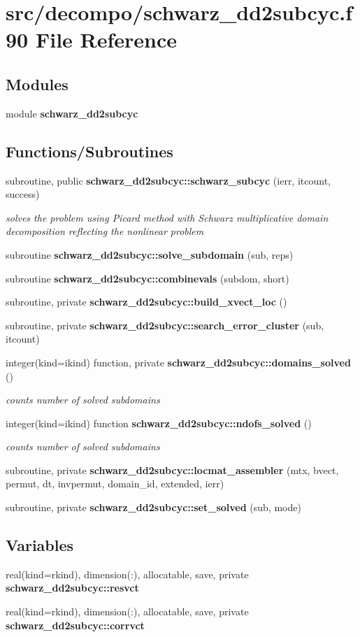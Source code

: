 \section{src/decompo/schwarz\+\_\+dd2subcyc.f90 File Reference}
\label{schwarz__dd2subcyc_8f90}
\subsection*{Modules}
\begin{DoxyCompactItemize}
\item 
module {\bf schwarz\+\_\+dd2subcyc}
\end{DoxyCompactItemize}
\subsection*{Functions/\+Subroutines}
\begin{DoxyCompactItemize}
\item 
subroutine, public {\bf schwarz\+\_\+dd2subcyc\+::schwarz\+\_\+subcyc} (ierr, itcount, success)
\begin{DoxyCompactList}\small\item\em solves the problem using Picard method with Schwarz multiplicative domain decomposition reflecting the nonlinear problem \end{DoxyCompactList}\item 
subroutine {\bf schwarz\+\_\+dd2subcyc\+::solve\+\_\+subdomain} (sub, reps)
\item 
subroutine {\bf schwarz\+\_\+dd2subcyc\+::combinevals} (subdom, short)
\item 
subroutine, private {\bf schwarz\+\_\+dd2subcyc\+::build\+\_\+xvect\+\_\+loc} ()
\item 
subroutine, private {\bf schwarz\+\_\+dd2subcyc\+::search\+\_\+error\+\_\+cluster} (sub, itcount)
\item 
integer(kind=ikind) function, private {\bf schwarz\+\_\+dd2subcyc\+::domains\+\_\+solved} ()
\begin{DoxyCompactList}\small\item\em counts number of solved subdomains \end{DoxyCompactList}\item 
integer(kind=ikind) function {\bf schwarz\+\_\+dd2subcyc\+::ndofs\+\_\+solved} ()
\begin{DoxyCompactList}\small\item\em counts number of solved subdomains \end{DoxyCompactList}\item 
subroutine, private {\bf schwarz\+\_\+dd2subcyc\+::locmat\+\_\+assembler} (mtx, bvect, permut, dt, invpermut, domain\+\_\+id, extended, ierr)
\item 
subroutine, private {\bf schwarz\+\_\+dd2subcyc\+::set\+\_\+solved} (sub, mode)
\end{DoxyCompactItemize}
\subsection*{Variables}
\begin{DoxyCompactItemize}
\item 
real(kind=rkind), dimension(\+:), allocatable, save, private {\bf schwarz\+\_\+dd2subcyc\+::resvct}
\item 
real(kind=rkind), dimension(\+:), allocatable, save, private {\bf schwarz\+\_\+dd2subcyc\+::corrvct}
\end{DoxyCompactItemize}
